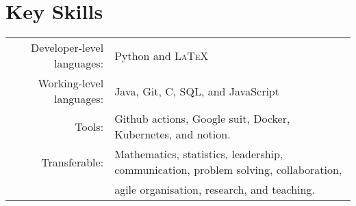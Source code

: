 \documentclass[a4paper,10pt]{article}
\begin{document}
\vspace{-0.05 in}

\section{Key Skills}
\begin{tabular}{rl}
	Developer-level languages: &  Python and \textsc{LaTeX}\\
	Working-level languages: & Java, Git, C, SQL, and JavaScript\\
	Tools: & Github actions, Google suit, Docker, Kubernetes, and notion.\\
	Transferable: & Mathematics, statistics, leadership, communication, problem solving, collaboration,\\
	& agile organisation, research, and teaching. 	
\end{tabular}
\vspace{-0.05 in}
\end{document}
